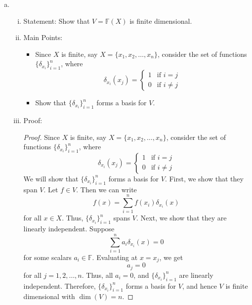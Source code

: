 \documentclass{article}
\begin{document}
\begin{enumerate}[a)]
        \item \begin{enumerate}[i)]
            \item Statement: Show that $V = \mathbb{F}(X)$ is finite dimensional.
            \item Main Points:
                \begin{itemize}
                    \item Since $X$ is finite, say $X = \{x_1, x_2, \ldots, x_n\}$, consider the set of functions $\{\delta_{x_i}\}_{i=1}^n$, where
                    \[
                        \delta_{x_i}(x_j) = \begin{cases}
                            1 & \text{if } i = j \\
                            0 & \text{if } i \neq j
                        \end{cases}
                    \]
                    \item Show that $\{\delta_{x_i}\}_{i=1}^n$ forms a basis for $V$.
                \end{itemize}
            \item Proof:
            \begin{proof}
                Since $X$ is finite, say $X = \{x_1, x_2, \ldots, x_n\}$, consider the set of functions $\{\delta_{x_i}\}_{i=1}^n$, where
                \[
                    \delta_{x_i}(x_j) = \begin{cases}
                        1 & \text{if } i = j \\
                        0 & \text{if } i \neq j
                    \end{cases}
                \]
                We will show that $\{\delta_{x_i}\}_{i=1}^n$ forms a basis for $V$. First, we show that they span $V$. Let $f \in V$. Then we can write
                \[
                    f(x) = \sum_{i=1}^n f(x_i) \delta_{x_i}(x)
                \]
                for all $x \in X$. Thus, $\{\delta_{x_i}\}_{i=1}^n$ spans $V$. Next, we show that they are linearly independent. Suppose
                \[
                    \sum_{i=1}^n a_i \delta_{x_i}(x) = 0
                \]
                for some scalars $a_i \in \mathbb{F}$. Evaluating at $x = x_j$, we get
                \[
                    a_j = 0
                \]
                for all $j = 1, 2, \ldots, n$. Thus, all $a_i = 0$, and $\{\delta_{x_i}\}_{i=1}^n$ are linearly independent. Therefore, $\{\delta_{x_i}\}_{i=1}^n$ forms a basis for $V$, and hence $V$ is finite dimensional with $\dim(V) = n$.
            \end{proof}
        \end{enumerate}
\end{enumerate}
\end{document}

